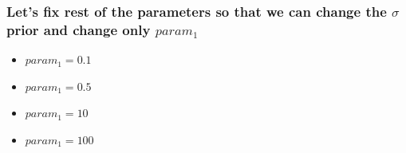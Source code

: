 \documentclass[
]{article}
\providecommand{\tightlist}{%
  \setlength{\itemsep}{0pt}\setlength{\parskip}{0pt}}
\begin{document}
\hypertarget{lets-fix-rest-of-the-parameters-so-that-we-can-change-the-sigma-prior-and-change-only-param_1}{%
\subsubsection{\texorpdfstring{Let's fix rest of the parameters so that
we can change the \(\sigma\) prior and change only
\(param_1\)}{Let's fix rest of the parameters so that we can change the \textbackslash sigma prior and change only param\_1}}\label{lets-fix-rest-of-the-parameters-so-that-we-can-change-the-sigma-prior-and-change-only-param_1}}

\begin{itemize}
\tightlist
\item
  \(param_1 = 0.1\)
\item
  \(param_1 = 0.5\)
\item
  \(param_1 = 10\)
\item
  \(param_1 = 100\)
\end{itemize}
\end{document}
